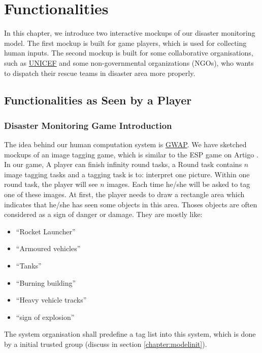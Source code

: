 \section{Functionalities}
\label{chapter:func}

In this chapter,
we introduce two interactive mockups of our disaster monitoring model.
The first mockup is built for game players,
which is used for collecting human inputs.
The second mockup is built for some collaborative organisations,
such as \hyperref[idx:unicef]{UNICEF} and some non-governmental organizations (NGOs),
who wants to dispatch their rescue teams in disaster area more properly. 

\subsection{Functionalities as Seen by a Player}

\subsubsection{Disaster Monitoring Game Introduction}
The idea behind our human computation system is \hyperref[idx:gwap]{GWAP}.
We have sketched mockups of an image tagging game,
which is similar to the ESP game on Artigo \cite{wieser2013artigo}.
In our game,
A player can finish infinity round tasks, 
a Round task contains $n$ image tagging tasks and a tagging task is to: interpret one picture.
Within one round task, the player will see $n$ images.
Each time he/she will be asked to tag one of these images.
At first,
the player needs to draw a rectangle area which indicates that he/she has seen some objects in this area.
Thoses objects are often considered as a sign of danger or damage.
They are mostly like:

\begin{itemize}
  \item ``Rocket Launcher''
  \item ``Armoured vehicles''
  \item ``Tanks''
  \item ``Burning building''
  \item ``Heavy vehicle tracks''
  \item ``sign of explosion''
\end{itemize}

The system organisation shall predefine a tag list into this system, 
which is done by a initial trusted group (discuss in section \ref{chapter:modelinit}).

